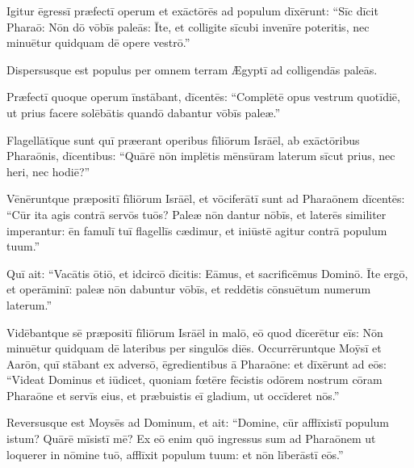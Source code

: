 Igitur ēgressī præfectī
operum et exāctōrēs ad populum dīxērunt: ``Sīc dīcit
Pharaō: Nōn dō vōbīs paleās:  Īte, et
colligite sīcubi invenīre poteritis, nec
minuētur quidquam dē opere vestrō.''

Dispersusque est
populus per omnem terram Ægyptī ad colligendās
paleās.

Præfectī quoque operum
īnstābant, dīcentēs: ``Complētē opus vestrum
quotīdiē, ut prius facere solēbātis quandō dabantur vōbīs
paleæ.''  

Flagellātīque sunt quī præerant
operibus fīliōrum Isrāēl, ab exāctōribus
Pharaōnis, dīcentibus: ``Quārē nōn implētis mēnsūram
laterum sīcut prius, nec heri, nec hodiē?''

Vēnēruntque præpositī
fīliōrum Isrāēl, et vōciferātī sunt ad Pharaōnem dīcentēs: ``Cūr ita
agis contrā servōs tuōs?  Paleæ nōn dantur nōbīs, et
laterēs similiter imperantur:
ēn
famulī
tuī flagellīs cædimur, et iniūstē agitur contrā populum
tuum.''

Quī ait: ``Vacātis ōtiō, et
idcircō dīcitis: Eāmus, et
sacrificēmus Dominō.  Īte ergō, et operāminī:
paleæ nōn dabuntur vōbīs, et reddētis
cōnsuētum numerum laterum.''

Vidēbantque sē præpositī
fīliōrum Isrāēl in malō, eō quod dīcerētur eīs: Nōn
minuētur quidquam dē lateribus per singulōs diēs.  Occurrēruntque Moȳsī
et Aarōn, quī stābant ex adversō, ēgredientibus ā Pharaōne:
et dīxērunt ad eōs: ``Videat Dominus et iūdicet,
quoniam fœtēre fēcistis odōrem nostrum cōram
Pharaōne et servīs eius, et præbuistis eī
gladium, ut occīderet nōs.''

Reversusque est Moysēs ad
Dominum, et ait: ``Domine, cūr afflīxistī populum
is\-tum? Quārē mīsistī mē?  Ex eō enim quō ingressus sum ad Pharaōnem ut loquerer in nōmine tuō,
afflīxit populum tuum: et nōn līberāstī eōs.''

